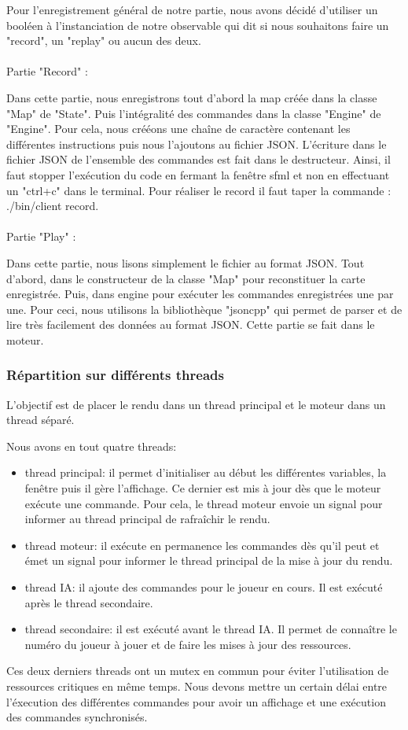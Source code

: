\documentclass[12pt,a4paper]{article}
\begin{document}
Pour l'enregistrement général de notre partie, nous avons décidé d'utiliser un booléen à l'instanciation de notre observable qui dit si nous souhaitons faire un "record", un "replay" ou aucun des deux.\\
\\Partie "Record" :

Dans cette partie, nous enregistrons tout d'abord la map créée dans la classe "Map" de "State". Puis l'intégralité des commandes dans la classe "Engine" de "Engine". Pour cela, nous crééons une chaîne de caractère contenant les différentes instructions puis nous l'ajoutons au fichier JSON. L'écriture dans le fichier JSON de l'ensemble des commandes est fait dans le destructeur. Ainsi, il faut stopper l'exécution du code en fermant la fenêtre sfml et non en effectuant un "ctrl+c" dans le terminal. Pour réaliser le record il faut taper la commande : ./bin/client record.\\
\\Partie "Play" : 

Dans cette partie, nous lisons simplement le fichier au format JSON. Tout d'abord, dans le constructeur de la classe "Map" pour reconstituer la carte enregistrée. Puis, dans engine pour exécuter les commandes enregistrées une par une. Pour ceci, nous utilisons la bibliothèque "jsoncpp" qui permet de parser et de lire très facilement des données au format JSON. Cette partie se fait dans le moteur.

\subsubsection{Répartition sur différents threads}

L'objectif est de placer le rendu dans un thread principal et le moteur dans un thread séparé. 

Nous avons en tout quatre threads: 
\begin{itemize}
    \item thread principal: il permet d'initialiser au début les différentes variables, la fenêtre puis il gère l'affichage. Ce dernier est mis à jour dès que le moteur exécute une commande. Pour cela, le thread moteur envoie un signal pour informer au thread principal de rafraîchir le rendu.
    \item thread moteur: il exécute en permanence les commandes dès qu'il peut et émet un signal pour informer le thread principal de la mise à jour du rendu. 
    \item thread IA: il ajoute des commandes pour le joueur en cours. Il est exécuté après le thread secondaire.
    \item thread secondaire: il est exécuté avant le thread IA. Il permet de connaître le numéro du joueur à jouer et de faire les mises à jour des ressources.
    
\end{itemize}
Ces deux derniers threads ont un mutex en commun pour éviter l'utilisation de ressources critiques en même temps.
Nous devons mettre un certain délai entre l'éxecution des différentes commandes pour avoir un affichage et une exécution des commandes synchronisés.
\end{document}
